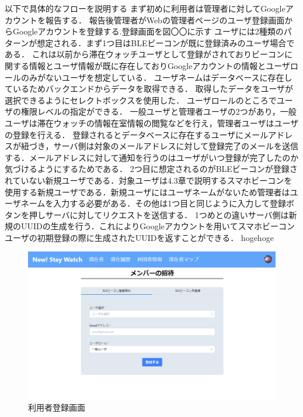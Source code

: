 以下で具体的なフローを説明する
まず初めに利用者は管理者に対してGoogleアカウントを報告する．
報告後管理者がWebの管理者ページのユーザ登録画面からGoogleアカウントを登録する.登録画面を図〇〇に示す
ユーザには2種類のパターンが想定される．まず1つ目はBLEビーコンが既に登録済みのユーザ場合である．
これは以前から滞在ウォッチユーザとして登録がされておりビーコンに関する情報とユーザ情報が既に存在しておりGoogleアカウントの情報とユーザロールのみがないユーザを想定している．
ユーザネームはデータベースに存在しているためバックエンドからデータを取得できる．
取得したデータをユーザが選択できるようにセレクトボックスを使用した．
ユーザロールのところでユーザの権限レベルの指定ができる．
一般ユーザと管理者ユーザの2つがあり，一般ユーザは滞在ウォッチの情報在室情報の閲覧などを行え，管理者ユーザはユーザの登録を行える．
登録されるとデータベースに存在するユーザにメールアドレスが紐づき，サーバ側は対象のメールアドレスに対して登録完了のメールを送信する．メールアドレスに対して通知を行うのはユーザがいつ登録が完了したのか気づけるようにするためである．
2つ目に想定されるのがBLEビーコンが登録されていない新規ユーザである．対象ユーザは4.3章で説明するスマホビーコンを使用する新規ユーザである．新規ユーザにはユーザネームがないため管理者はユーザネームを入力する必要がある．その他は1つ目と同じように入力して登録ボタンを押しサーバに対してリクエストを送信する．
1つめとの違いサーバ側は新規のUUIDの生成を行う．これによりGoogleアカウントを用いてスマホビーコンユーザの初期登録の際に生成されたUUIDを返すことができる．
hogehoge


\begin{figure}[tbh]
  \centering
  \includegraphics[width=16cm]{image/registerUser.png}
  \caption{利用者登録画面}
  \label{multipleBPM}
\end{figure}


